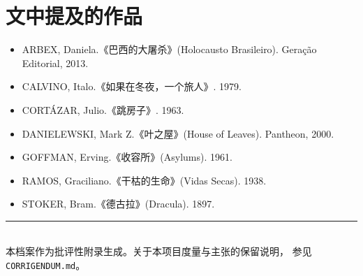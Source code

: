 \documentclass[11pt,a4paper]{article}
\begin{document}
\section*{文中提及的作品}

\begin{itemize}\small
\item ARBEX, Daniela.《巴西的大屠杀》(Holocausto Brasileiro). Geração Editorial, 2013.
\item CALVINO, Italo.《如果在冬夜，一个旅人》. 1979.
\item CORTÁZAR, Julio.《跳房子》. 1963.
\item DANIELEWSKI, Mark Z.《叶之屋》(House of Leaves). Pantheon, 2000.
\item GOFFMAN, Erving.《收容所》(Asylums). 1961.
\item RAMOS, Graciliano.《干枯的生命》(Vidas Secas). 1938.
\item STOKER, Bram.《德古拉》(Dracula). 1897.
\end{itemize}

\vfill
\noindent\rule{\linewidth}{0.4pt}\\
{\footnotesize 本档案作为批评性附录生成。关于本项目度量与主张的保留说明，
参见 \texttt{CORRIGENDUM.md}。}
\end{document}
